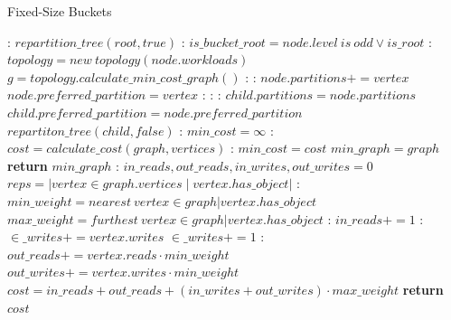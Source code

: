 \begin{algorithm}
  \caption{Fixed-Size Buckets}\label{alg:fixed-size}
  \begin{algorithmic}[1]
    :
  \State $repartition\_tree(root, true)$
  \EndFunction
  :
  \State $is\_bucket\_root = node.level\ is\ odd \vee is\_root$
    :
      \State $topology = new\ topology(node.workloads)$
      \State $g = topology.calculate\_min\_cost\_graph()$
      :
        :
        \State $node.partitions += vertex$
            \State $node.preferred\_partition = vertex$
          \EndIf
        \EndIf
      \EndFor
    \EndIf
    :
      :
      :
        \State $child.partitions = node.partitions$
        \State $child.preferred\_partition = node.preferred\_partition$
      \EndIf
        \State $repartiton\_tree(child, false)$
        \EndFor
    \EndIf
    \EndFunction
    :
    \State $min\_cost = \infty$
      :
        \State $cost = calculate\_cost(graph, vertices)$
        :
          \State $min\_cost = cost$
          \State $min\_graph = graph$
        \EndIf
      \EndFor
    \State \textbf{return} $min\_graph$
    \EndFunction
    :
      \State $in\_reads, out\_reads, in\_writes, out\_writes = 0$
      \State $reps = |vertex \in graph.vertices \mid vertex.has\_object|$
      :
      \State $min\_weight = nearest\ vertex \in graph | vertex.has\_object$
      \State $max\_weight = furthest\ vertex \in graph | vertex.has\_object$
        :
          \State $in\_reads+= 1$
          :
          \State $\in\_writes+= vertex.writes$
          \Else
          \State  $\in\_writes+= 1 $
          \EndIf
        \Else:
          \State $out\_reads += vertex.reads \cdot min\_weight$
          \State $out\_writes += vertex.writes \cdot min\_weight$
        \EndIf
      \EndFor
      \State $cost = in\_reads+ out\_reads + (in\_writes+ out\_writes) \cdot max\_weight$
      \State \textbf{return} $cost$
  \EndFunction
  \end{algorithmic}
  \end{algorithm}

